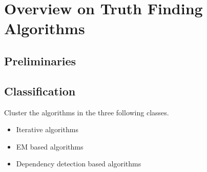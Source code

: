 \section{Overview on Truth Finding Algorithms}

\subsection{Preliminaries}
\subsection{Classification}

Cluster the algorithms in the three following classes.
\begin{itemize}
 \item Iterative algorithms
 \item EM based algorithms
 \item Dependency detection based algorithms
\end{itemize}
